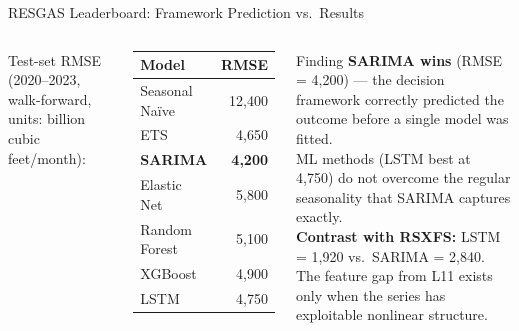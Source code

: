 \documentclass[aspectratio=169, 10pt]{beamer}
\begin{document}
\begin{frame}{RESGAS Leaderboard: Framework Prediction vs.\ Results}
  \begin{columns}[T]
      {\footnotesize Test-set RMSE (2020--2023,
      walk-forward, units: billion cubic feet/month):}
      \vspace{0.1cm}
      \begin{center}
      {\footnotesize
      \begin{tabular}{lr}
        \toprule
        \textbf{Model} & \textbf{RMSE} \\
        \midrule
        Seasonal Na\"{i}ve  & 12{,}400 \\
        ETS                  & 4{,}650 \\
        \textbf{SARIMA}      & \textbf{4{,}200} \\
        Elastic Net          & 5{,}800 \\
        Random Forest        & 5{,}100 \\
        XGBoost              & 4{,}900 \\
        LSTM                 & 4{,}750 \\
        \bottomrule
      \end{tabular}
      }
      \end{center}
      \begin{examplebox}{Finding}
        {\small \textbf{SARIMA wins} (RMSE = 4,200) --- the decision
        framework correctly predicted the outcome before a single
        model was fitted.\\[4pt]
        ML methods (LSTM best at 4,750) do not overcome the
        regular seasonality that SARIMA captures exactly.\\[4pt]
        \textbf{Contrast with RSXFS:}
        LSTM = 1,920 vs.\ SARIMA = 2,840.
        The feature gap from L11 exists only
        when the series has exploitable nonlinear structure.}
      \end{examplebox}
  \end{columns}
  \smallskip
\end{frame}
\end{document}
